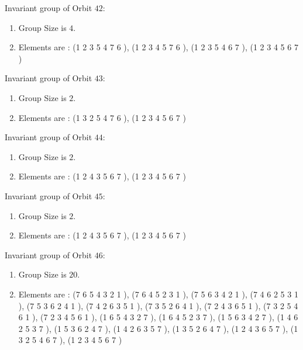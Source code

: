 \documentclass[12pt]{article}
\begin{document}
Invariant group of Orbit $42$:
\begin{enumerate}
\item Group Size is $4$.
\item Elements are : (1 2 3 5 4 7 6  ), (1 2 3 4 5 7 6  ), (1 2 3 5 4 6 7  ), (1 2 3 4 5 6 7  )
\end{enumerate}
Invariant group of Orbit $43$:
\begin{enumerate}
\item Group Size is $2$.
\item Elements are : (1 3 2 5 4 7 6  ), (1 2 3 4 5 6 7  )
\end{enumerate}
Invariant group of Orbit $44$:
\begin{enumerate}
\item Group Size is $2$.
\item Elements are : (1 2 4 3 5 6 7  ), (1 2 3 4 5 6 7  )
\end{enumerate}
Invariant group of Orbit $45$:
\begin{enumerate}
\item Group Size is $2$.
\item Elements are : (1 2 4 3 5 6 7  ), (1 2 3 4 5 6 7  )
\end{enumerate}
Invariant group of Orbit $46$:
\begin{enumerate}
\item Group Size is $20$.
\item Elements are : (7 6 5 4 3 2 1  ), (7 6 4 5 2 3 1  ), (7 5 6 3 4 2 1  ), (7 4 6 2 5 3 1  ), (7 5 3 6 2 4 1  ), (7 4 2 6 3 5 1  ), (7 3 5 2 6 4 1  ), (7 2 4 3 6 5 1  ), (7 3 2 5 4 6 1  ), (7 2 3 4 5 6 1  ), (1 6 5 4 3 2 7  ), (1 6 4 5 2 3 7  ), (1 5 6 3 4 2 7  ), (1 4 6 2 5 3 7  ), (1 5 3 6 2 4 7  ), (1 4 2 6 3 5 7  ), (1 3 5 2 6 4 7  ), (1 2 4 3 6 5 7  ), (1 3 2 5 4 6 7  ), (1 2 3 4 5 6 7  )
\end{enumerate}
\end{document}
